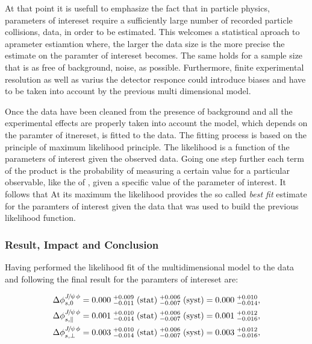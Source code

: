 At that point it is usefull to emphasize the fact that in particle physics, parameters of intereset
require a sufficiently large number of recorded particle collisions, data, in order to be estimated.
This welcomes a statistical aproach to aprameter estiamtion where, the larger the data size is the
more precise the estimate on the paramter of intereset becomes. The same holds for a sample size that
is as free of background, noise, as possible. Furthermore, finite experimental resolution as well as
varius the detector responce could introduce biases and have to be taken into account by the previous
multi dimensional model.

Once the data have been cleaned from the presence of background and all the experimental effects are
properly taken into account the model, which depends on the paramter of itnereset, is fitted to the data.
The fitting process is based on the principle of maximum likelihood principle. The likelihood is a
function of the parameters of interest given the observed data. Going one step further each term of
the product is the probability of measuring a certain value for a particular observable, like the
\mass{\Bs} of , given a specific value of the parameter of interest. It follows that
At its maximum the likelihood provides the so called {\it best fit} estimate for the paramters
of interest given the data that was used to build the previous likelihood function.

\subsubsection{Result, Impact and Conclusion}

Having performed the likelihood fit of the multidimensional model to the data and
following \cite{Fleischer:1999zi,Faller:2008gt,DeBruyn:2014oga,DeBruyn-thesis} the
final result for the paramters of intereset are:

\begin{subequations}
\label{app_delta_phis_result}
\begin{align}
\Delta\phi^{{J\mskip -3mu/\mskip -2mu\psi\mskip 2mu}\phi}_{s,{0}}         & = 0.000 \; ^{+0.009}_{-0.011} \; {\rm (stat)} \; ^{+0.006}_{-0.007} \; ({\rm syst}) = 0.000 \; ^{+0.010}_{-0.014},\\
\Delta\phi^{{J\mskip -3mu/\mskip -2mu\psi\mskip 2mu}\phi}_{s,{\parallel}} & = 0.001 \; ^{+0.010}_{-0.014} \; {\rm (stat)} \; ^{+0.006}_{-0.007} \; ({\rm syst)} = 0.001 \; ^{+0.012}_{-0.016},\\
\Delta\phi^{{J\mskip -3mu/\mskip -2mu\psi\mskip 2mu}\phi}_{s,{\perp}}     & = 0.003 \; ^{+0.010}_{-0.014} \; {\rm (stat)} \; ^{+0.006}_{-0.007} \; ({\rm syst)} = 0.003 \; ^{+0.012}_{-0.016},
\end{align}
\end{subequations}

